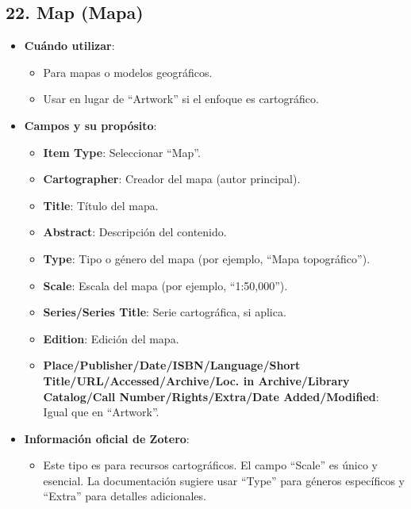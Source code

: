 \documentclass[
  jou,
  floatsintext,
  longtable,
  a4paper,
  nolmodern,
  notxfonts,
  notimes,
  colorlinks=true,linkcolor=blue,citecolor=blue,urlcolor=blue]{apa7}
\providecommand{\tightlist}{%
  \setlength{\itemsep}{0pt}\setlength{\parskip}{0pt}}
\begin{document}
\subsection{22. Map (Mapa)}\label{map-mapa}

\begin{itemize}
\tightlist
\item
  \textbf{Cuándo utilizar}:

  \begin{itemize}
  \tightlist
  \item
    Para mapas o modelos geográficos.
  \item
    Usar en lugar de ``Artwork'' si el enfoque es cartográfico.
  \end{itemize}
\item
  \textbf{Campos y su propósito}:

  \begin{itemize}
  \tightlist
  \item
    \textbf{Item Type}: Seleccionar ``Map''.
  \item
    \textbf{Cartographer}: Creador del mapa (autor principal).
  \item
    \textbf{Title}: Título del mapa.
  \item
    \textbf{Abstract}: Descripción del contenido.
  \item
    \textbf{Type}: Tipo o género del mapa (por ejemplo, ``Mapa
    topográfico'').
  \item
    \textbf{Scale}: Escala del mapa (por ejemplo, ``1:50,000'').
  \item
    \textbf{Series/Series Title}: Serie cartográfica, si aplica.
  \item
    \textbf{Edition}: Edición del mapa.
  \item
    \textbf{Place/Publisher/Date/ISBN/Language/Short
    Title/URL/Accessed/Archive/Loc. in Archive/Library Catalog/Call
    Number/Rights/Extra/Date Added/Modified}: Igual que en ``Artwork''.
  \end{itemize}
\item
  \textbf{Información oficial de Zotero}:

  \begin{itemize}
  \tightlist
  \item
    Este tipo es para recursos cartográficos. El campo ``Scale'' es
    único y esencial. La documentación sugiere usar ``Type'' para
    géneros específicos y ``Extra'' para detalles adicionales.
  \end{itemize}
\end{itemize}
\end{document}
